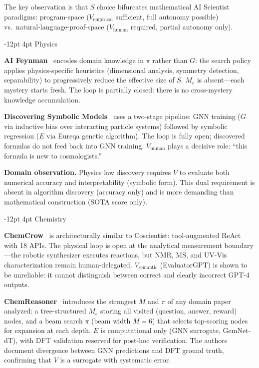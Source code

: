 \documentclass[11pt]{article}
\makeatletter
\renewcommand\subsection{\@startsection{subsection}{2}{\z@}%
  {-12pt \@plus -2pt \@minus -2pt}%
  {4pt \@plus 1pt}%
  {\normalfont\normalsize\bfseries}}
\makeatother
\begin{document}
The key observation is that $S$ choice bifurcates mathematical AI Scientist paradigms: program-space ($V_\text{empirical}$ sufficient, full autonomy possible) vs.\ natural-language-proof-space ($V_\text{human}$ required, partial autonomy only).

\subsection{Physics}

\textbf{AI Feynman}~\citep{udrescu2020afeynman} encodes domain knowledge in $\pi$ rather than $G$: the search policy applies physics-specific heuristics (dimensional analysis, symmetry detection, separability) to progressively reduce the effective size of $S$. $M_e$ is absent---each mystery starts fresh. The loop is partially closed: there is no cross-mystery knowledge accumulation.

\textbf{Discovering Symbolic Models}~\citep{cranmer2020symbolic} uses a two-stage pipeline: GNN training ($G$ via inductive bias over interacting particle systems) followed by symbolic regression ($E$ via Eureqa genetic algorithm). The loop is fully open; discovered formulas do not feed back into GNN training. $V_\text{human}$ plays a decisive role: ``this formula is new to cosmologists.''

\textbf{Domain observation.} Physics law discovery requires $V$ to evaluate both numerical accuracy and interpretability (symbolic form). This dual requirement is absent in algorithm discovery (accuracy only) and is more demanding than mathematical construction (SOTA score only).

\subsection{Chemistry}

\textbf{ChemCrow}~\citep{bran2023chemcrow} is architecturally similar to Coscientist: tool-augmented ReAct with 18 APIs. The physical loop is open at the analytical measurement boundary---the robotic synthesizer executes reactions, but NMR, MS, and UV-Vis characterization remain human-delegated. $V_\text{semantic}$ (EvaluatorGPT) is shown to be unreliable: it cannot distinguish between correct and clearly incorrect GPT-4 outputs.

\textbf{ChemReasoner}~\citep{sprueill2024chemreasoner} introduces the strongest $M$ and $\pi$ of any domain paper analyzed: a tree-structured $M_e$ storing all visited (question, answer, reward) nodes, and a beam search $\pi$ (beam width $M=6$) that selects top-scoring nodes for expansion at each depth. $E$ is computational only (GNN surrogate, GemNet-dT), with DFT validation reserved for post-hoc verification. The authors document divergence between GNN predictions and DFT ground truth, confirming that $V$ is a surrogate with systematic error.
\end{document}
